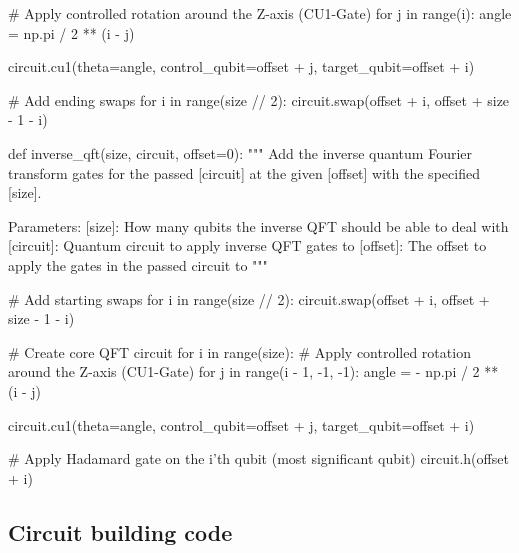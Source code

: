 \begin{python}
    # Apply controlled rotation around the Z-axis (CU1-Gate)
    for j in range(i):
        angle = np.pi / 2 ** (i - j)

        circuit.cu1(theta=angle, control_qubit=offset + j, target_qubit=offset + i)

    # Add ending swaps
    for i in range(size // 2):
        circuit.swap(offset + i, offset + size - 1 - i)


def inverse_qft(size, circuit, offset=0):
    """
    Add the inverse quantum Fourier transform gates for the passed [circuit]
    at the given [offset] with the specified [size].

    Parameters:
    [size]: How many qubits the inverse QFT should be able to deal with
    [circuit]: Quantum circuit to apply inverse QFT gates to
    [offset]: The offset to apply the gates in the passed circuit to
    """

    # Add starting swaps
    for i in range(size // 2):
        circuit.swap(offset + i, offset + size - 1 - i)

    # Create core QFT circuit
    for i in range(size):
        # Apply controlled rotation around the Z-axis (CU1-Gate)
        for j in range(i - 1, -1, -1):
            angle = - np.pi / 2 ** (i - j)

            circuit.cu1(theta=angle, control_qubit=offset + j, target_qubit=offset + i)

    # Apply Hadamard gate on the i'th qubit (most significant qubit)
    circuit.h(offset + i)
\end{python}

\subsection{Circuit building code}
\label{subsec:circuit-building-code}

